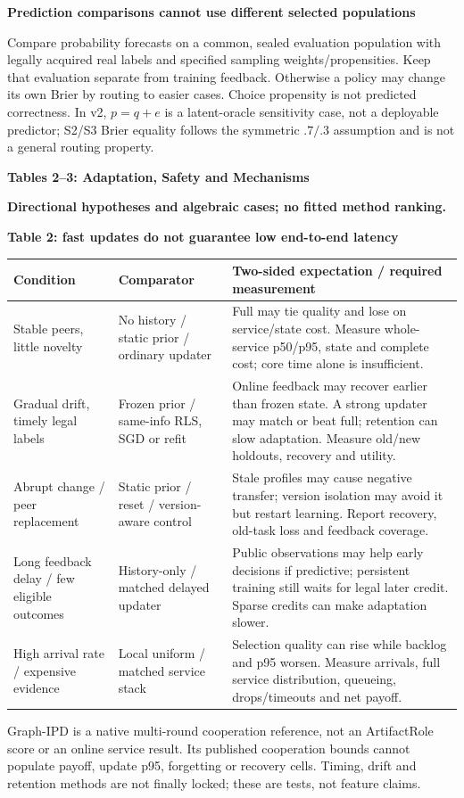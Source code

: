 \documentclass[10pt,a4paper]{article}
\newcommand{\lead}[1]{\vspace{4pt}\textbf{#1}\par}
\newcommand{\caution}{\textcolor{red!70!black}{\textbf{Directional hypotheses and algebraic cases; no fitted method ranking.}}\par}
\begin{document}
\lead{Prediction comparisons cannot use different selected populations}
Compare probability forecasts on a common, sealed evaluation population with
legally acquired real labels and specified sampling weights/propensities.
Keep that evaluation separate from training feedback. Otherwise a policy may
change its own Brier by routing to easier cases. Choice propensity is not
predicted correctness. In v2, $p=q+e$ is a latent-oracle sensitivity case,
not a deployable predictor; S2/S3 Brier equality follows the symmetric $.7/.3$
assumption and is not a general routing property.

\clearpage
{\large\bfseries Tables 2--3: Adaptation, Safety and Mechanisms}\par\caution
\lead{Table 2: fast updates do not guarantee low end-to-end latency}
\begin{center}\small
\begin{tabularx}{\linewidth}{@{}L{.20\linewidth}L{.23\linewidth}X@{}}\toprule
Condition & Comparator & Two-sided expectation / required measurement\\\midrule
Stable peers, little novelty & No history / static prior / ordinary updater & Full may tie quality and lose on service/state cost. Measure whole-service p50/p95, state and complete cost; core time alone is insufficient.\\
Gradual drift, timely legal labels & Frozen prior / same-info RLS, SGD or refit & Online feedback may recover earlier than frozen state. A strong updater may match or beat full; retention can slow adaptation. Measure old/new holdouts, recovery and utility.\\
Abrupt change / peer replacement & Static prior / reset / version-aware control & Stale profiles may cause negative transfer; version isolation may avoid it but restart learning. Report recovery, old-task loss and feedback coverage.\\
Long feedback delay / few eligible outcomes & History-only / matched delayed updater & Public observations may help early decisions if predictive; persistent training still waits for legal later credit. Sparse credits can make adaptation slower.\\
High arrival rate / expensive evidence & Local uniform / matched service stack & Selection quality can rise while backlog and p95 worsen. Measure arrivals, full service distribution, queueing, drops/timeouts and net payoff.\\\bottomrule
\end{tabularx}\end{center}
Graph-IPD is a native multi-round cooperation reference, not an ArtifactRole
score or an online service result. Its published cooperation bounds cannot
populate payoff, update p95, forgetting or recovery cells. Timing, drift and
retention methods are not finally locked; these are tests, not feature claims.
\end{document}
